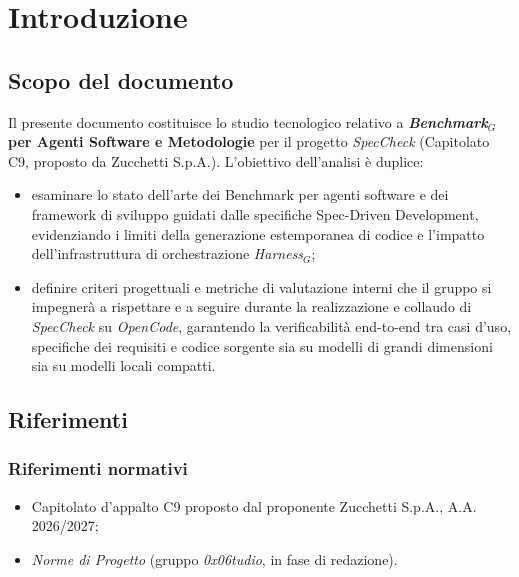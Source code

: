 \documentclass[a4paper, 11pt]{article}
\newcommand{\term}[1]{\textit{#1}$_G$} %
\begin{document}
\newpage
\renewcommand{\contentsname}{Indice}
\tableofcontents
\newpage

\section{Introduzione}

\subsection{Scopo del documento}
Il presente documento costituisce lo studio tecnologico relativo a \textbf{\term{Benchmark} per Agenti Software e Metodologie} per il progetto \textit{SpecCheck} (Capitolato C9, proposto da Zucchetti S.p.A.). L'obiettivo dell'analisi è duplice:
\begin{itemize}[noitemsep]
    \item esaminare lo stato dell'arte dei Benchmark per agenti software e dei framework di sviluppo guidati dalle specifiche Spec-Driven Development, evidenziando i limiti della generazione estemporanea di codice e l'impatto dell'infrastruttura di orchestrazione \term{Harness};
    \item definire criteri progettuali e metriche di valutazione interni che il gruppo si impegnerà a rispettare e a seguire durante la realizzazione e collaudo di \textit{SpecCheck} su \textit{OpenCode}, garantendo la verificabilità end-to-end tra casi d'uso, specifiche dei requisiti e codice sorgente sia su modelli di grandi dimensioni sia su modelli locali compatti.
\end{itemize}

\subsection{Riferimenti}
\subsubsection{Riferimenti normativi}
\begin{itemize}[noitemsep]
    \item Capitolato d'appalto C9 proposto dal proponente Zucchetti S.p.A., A.A. 2026/2027;
    \item \textit{Norme di Progetto} (gruppo \textit{0x06tudio}, in fase di redazione).
\end{itemize}
\end{document}
